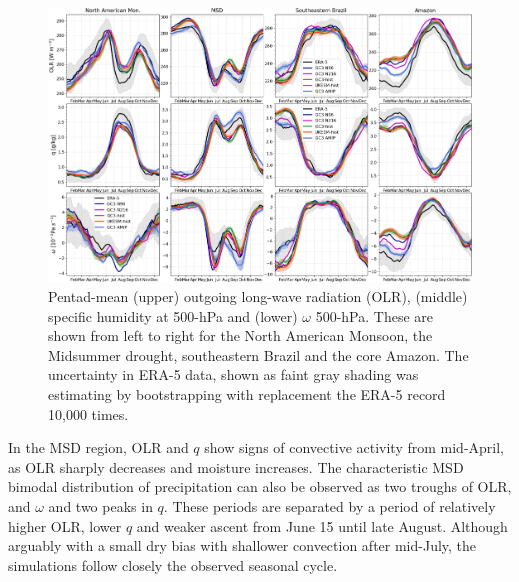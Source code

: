 \begin{figure}[t!]
\centering
 \includegraphics[width=\linewidth]{figures/fig9b.png}
\caption[Seasonal cycle of measures of convection in the AMS]{Pentad-mean (upper) outgoing long-wave radiation (OLR), (middle) specific humidity at 500-hPa and (lower) $\omega$ 500-hPa. These are shown from left to right for the North American Monsoon, the Midsummer drought, southeastern Brazil and the core Amazon. The uncertainty in ERA-5 data, shown as faint gray shading was estimating by bootstrapping with replacement the ERA-5 record 10,000 times. }
\label{fig:9}
\end{figure}

In the MSD region, OLR and $q$ show signs of convective activity from mid-April, as OLR sharply decreases and moisture increases.
The characteristic MSD bimodal distribution of precipitation can also be observed as two troughs of OLR, and $\omega$ and two peaks in $q$.
These periods are separated by a period of relatively higher OLR, lower $q$ and weaker ascent from June 15 until late August.
Although arguably with a small dry bias with shallower convection after mid-July, the simulations follow closely the observed seasonal cycle.

